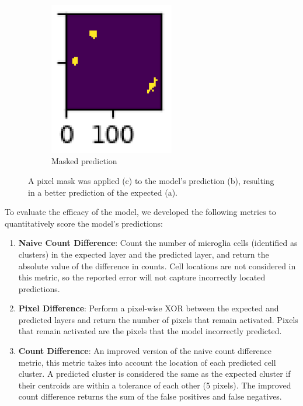 \documentclass{article}
\begin{document}
\begin{figure}[ht]
\begin{subfigure}{0.25\textwidth}
    \includegraphics[width=0.6\textwidth]{pixel-mask-masked.png}
    \centering
    \caption{Masked prediction}
  \end{subfigure}
  \centering
  \captionsetup{width=0.7\textwidth}
  \caption{A pixel mask was applied (c) to the model's prediction (b),
  resulting in a better prediction of the expected (a).}
  \label{fig:masked-pixels}
\end{figure}

To evaluate the efficacy of the model, we developed the following metrics to 
quantitatively score the model’s predictions:
\begin{enumerate}
\item \textbf{Naive Count Difference}: Count the number of microglia cells 
(identified as clusters) in the expected layer and the predicted layer, and 
return the absolute value of the difference in counts. Cell locations are not 
considered in this metric, so the reported error will not capture incorrectly 
located predictions.
\item \textbf{Pixel Difference}: Perform a pixel-wise XOR between the 
expected and predicted layers and return the number of pixels that remain 
activated. Pixels that remain activated are the pixels that the model 
incorrectly predicted.
\item \textbf{Count Difference}: An improved version of the naive count 
difference metric, this metric takes into account the location of each 
predicted cell cluster. A predicted cluster is considered the same as the 
expected cluster if their centroids are within a tolerance of each other (5 
pixels). The improved count difference returns the sum of the false positives 
and false negatives.
\end{enumerate}
\end{document}
